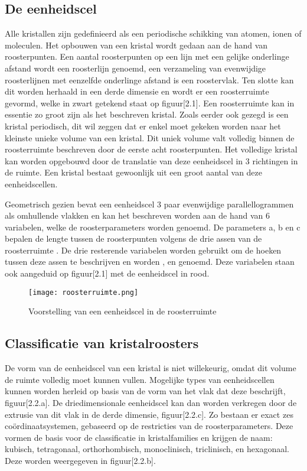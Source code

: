 \subsection{De eenheidscel}
Alle kristallen zijn gedefinieerd als een periodische schikking van atomen, ionen of moleculen. Het opbouwen van een kristal wordt gedaan aan de hand van roosterpunten. Een aantal roosterpunten op een lijn met een gelijke onderlinge afstand wordt een roosterlijn genoemd, een verzameling van evenwijdige roosterlijnen met eenzelfde onderlinge afstand is een roostervlak. Ten slotte kan dit worden herhaald in een derde dimensie en wordt er een roosterruimte gevormd, welke in zwart getekend staat op figuur[2.1]. Een roosterruimte kan in essentie zo groot zijn als het beschreven kristal. Zoals eerder ook gezegd is een kristal periodisch, dit wil zeggen dat er enkel moet gekeken worden naar het kleinste unieke volume van een kristal. Dit uniek volume valt volledig binnen de roosterruimte beschreven door de eerste acht roosterpunten. Het volledige kristal kan worden opgebouwd door de translatie van deze eenheidscel in 3 richtingen in de ruimte. Een kristal bestaat gewoonlijk uit een groot aantal van deze eenheidscellen.
\par
Geometrisch gezien bevat een eenheidscel 3 paar evenwijdige parallellogrammen als omhullende vlakken en kan het beschreven worden aan de hand van 6 variabelen, welke de roosterparameters worden genoemd.  De parameters a, b en c bepalen de lengte tussen de roosterpunten volgens de drie assen van de roosterruimte . De drie resterende  variabelen worden gebruikt om de hoeken tussen deze assen te beschrijven en worden \textalpha , \textbeta  en \textgamma  genoemd. Deze variabelen staan ook aangeduid op figuur[2.1] met de eenheidscel in rood. 

\begin{figure}
\texttt{[image: roosterruimte.png]}
\caption{Voorstelling van een eenheidscel in de roosterruimte \citep*{CRYS1}}
\end{figure}

\subsection{Classificatie van kristalroosters}
De vorm van de eenheidscel van een kristal is niet willekeurig, omdat dit volume de ruimte volledig moet kunnen vullen. Mogelijke types van eenheidscellen kunnen worden herleid op basis van de vorm van het vlak dat deze beschrijft, figuur[2.2.a]. De driedimensionale eenheidscel kan dan worden verkregen door de extrusie van dit vlak in de derde dimensie, figuur[2.2.c]. Zo bestaan er exact zes coördinaatsystemen, gebaseerd op de restricties van de roosterparameters. Deze vormen de basis voor de classificatie in kristalfamilies en krijgen de naam: kubisch, tetragonaal, orthorhombisch, monoclinisch, triclinisch, en hexagonaal. Deze worden weergegeven in figuur[2.2.b]. 

